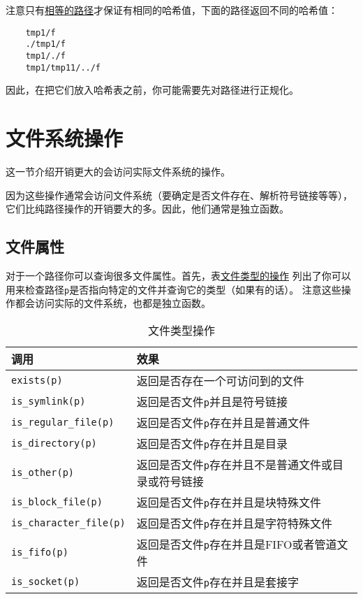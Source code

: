 注意只有\hyperref[ch20.3.6]{相等的路径}才保证有相同的哈希值，下面的路径返回不同的哈希值：
\begin{lstlisting}
    tmp1/f
    ./tmp1/f
    tmp1/./f
    tmp1/tmp11/../f
\end{lstlisting}
因此，在把它们放入哈希表之前，你可能需要先对路径进行正规化。


\section{文件系统操作}
这一节介绍开销更大的会访问实际文件系统的操作。

因为这些操作通常会访问文件系统（要确定是否文件存在、解析符号链接等等），
它们比纯路径操作的开销要大的多。因此，他们通常是独立函数。

\subsection{文件属性}\label{ch20.4.1}
对于一个路径你可以查询很多文件属性。首先，表\hyperref[t20.10]{文件类型的操作}
列出了你可以用来检查路径\texttt{p}是否指向特定的文件并查询它的类型（如果有的话）。
注意这些操作都会访问实际的文件系统，也都是独立函数。
\begin{table}[htb]
    \centering
    \begin{tabular}{l|l}
        \hline
        \textbf{调用}                     & \textbf{效果}                        \\
        \hline
        \texttt{exists(p)}              & 返回是否存在一个可访问到的文件                    \\
        \texttt{is\_symlink(p)}         & 返回是否文件\texttt{p}并且是符号链接            \\
        \texttt{is\_regular\_file(p)}   & 返回是否文件\texttt{p}存在并且是普通文件          \\
        \texttt{is\_directory(p)}       & 返回是否文件\texttt{p}存在并且是目录            \\
        \texttt{is\_other(p)}           & 返回是否文件\texttt{p}存在并且不是普通文件或目录或符号链接 \\
        \texttt{is\_block\_file(p)}     & 返回是否文件\texttt{p}存在并且是块特殊文件         \\
        \texttt{is\_character\_file(p)} & 返回是否文件\texttt{p}存在并且是字符特殊文件        \\
        \texttt{is\_fifo(p)}            & 返回是否文件\texttt{p}存在并且是FIFO或者管道文件    \\
        \texttt{is\_socket(p)}          & 返回是否文件\texttt{p}存在并且是套接字           \\
        \hline
    \end{tabular}
    \caption{文件类型操作}
    \label{t20.10}
\end{table}

